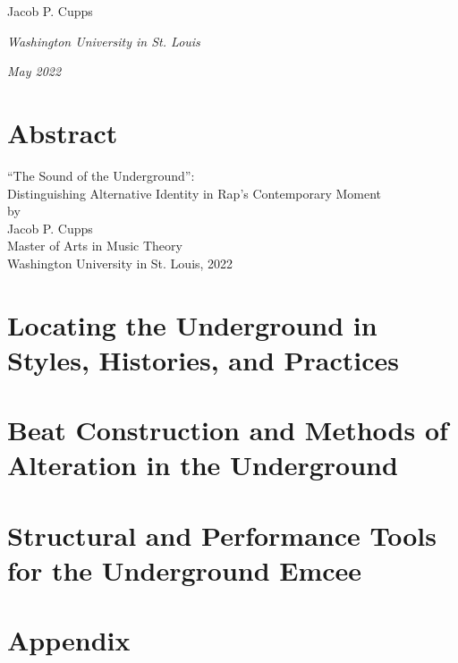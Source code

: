 \documentclass[12pt]{report}
\begin{document}
\vspace{0.2cm}
\hfill{Jacob P. Cupps}

\noindent \textit{Washington University in St. Louis}

\noindent \textit{May 2022}

    \chapter*{Abstract}
    
    \begin{center}
        \large ``The Sound of the Underground'': \\
        \large Distinguishing Alternative Identity in Rap's Contemporary Moment  \\
        \normalsize by \\
        Jacob P. Cupps \\
        Master of Arts in Music Theory \\
        
        Washington University in St. Louis, 2022 \\
    \end{center}
    
    \lipsum[0-1]

\chapter{Locating the Underground in Styles, Histories, and Practices}


\chapter{Beat Construction and Methods of Alteration in the Underground}


\chapter{Structural and Performance Tools for the Underground Emcee}



\singlespacing
\printbibliography
{}
\nocite{*}

\chapter*{Appendix}

\end{document}
